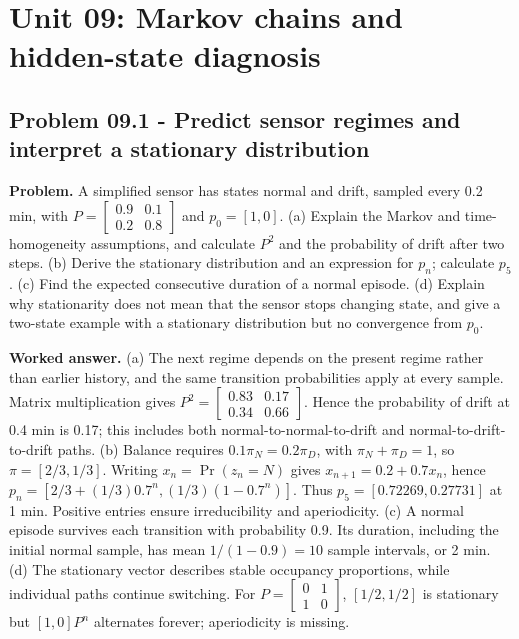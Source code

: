 \documentclass[11pt,a4paper]{article}
\begin{document}
\clearpage\section{Unit 09: Markov chains and hidden-state diagnosis}
\subsection{Problem 09.1 - Predict sensor regimes and interpret a stationary distribution}
\textbf{Problem.} A simplified sensor has states normal and drift, sampled every 0.2 min, with $P=\left[\begin{smallmatrix}0.9&0.1\\0.2&0.8\end{smallmatrix}\right]$ and $p_0=[1,0]$. (a) Explain the Markov and time-homogeneity assumptions, and calculate $P^2$ and the probability of drift after two steps. (b) Derive the stationary distribution and an expression for $p_n$; calculate $p_5$. (c) Find the expected consecutive duration of a normal episode. (d) Explain why stationarity does not mean that the sensor stops changing state, and give a two-state example with a stationary distribution but no convergence from $p_0$.


\textbf{Worked answer.} (a) The next regime depends on the present regime rather than earlier history, and the same transition probabilities apply at every sample. Matrix multiplication gives $P^2=\left[\begin{smallmatrix}0.83&0.17\\0.34&0.66\end{smallmatrix}\right]$. Hence the probability of drift at 0.4 min is 0.17; this includes both normal-to-normal-to-drift and normal-to-drift-to-drift paths. (b) Balance requires $0.1\pi_N=0.2\pi_D$, with $\pi_N+\pi_D=1$, so $\pi=[2/3,1/3]$. Writing $x_n=\Pr(z_n=N)$ gives $x_{n+1}=0.2+0.7x_n$, hence $p_n=[2/3+(1/3)0.7^n,(1/3)(1-0.7^n)]$. Thus $p_5=[0.72269,0.27731]$ at 1 min. Positive entries ensure irreducibility and aperiodicity. (c) A normal episode survives each transition with probability 0.9. Its duration, including the initial normal sample, has mean $1/(1-0.9)=10$ sample intervals, or 2 min. (d) The stationary vector describes stable occupancy proportions, while individual paths continue switching. For $P=\left[\begin{smallmatrix}0&1\\1&0\end{smallmatrix}\right]$, $[1/2,1/2]$ is stationary but $[1,0]P^n$ alternates forever; aperiodicity is missing.
\end{document}
